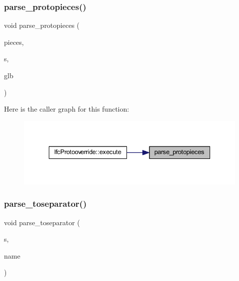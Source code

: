 \mbox{\label{grammar_8hh_a0b78f8e3b11c096eee3367e9f7a783c1}} 
\subsubsection{\texorpdfstring{parse\_protopieces()}{parse\_protopieces()}}
{\footnotesize\ttfamily void parse\+\_\+protopieces (\begin{DoxyParamCaption}\item[{\mbox{\hyperlink{struct_prototype_pieces}{Prototype\+Pieces}} \&}]{pieces,  }\item[{istream \&}]{s,  }\item[{\mbox{\hyperlink{class_architecture}{Architecture}} $\ast$}]{glb }\end{DoxyParamCaption})}

Here is the caller graph for this function\+:
\nopagebreak
\begin{figure}[H]
\begin{center}
\leavevmode
\includegraphics[width=335pt]{grammar_8hh_a0b78f8e3b11c096eee3367e9f7a783c1_icgraph}
\end{center}
\end{figure}
\mbox{\label{grammar_8hh_a555c48bf02e16474c1cf15e761ea7562}} 
\subsubsection{\texorpdfstring{parse\_toseparator()}{parse\_toseparator()}}
{\footnotesize\ttfamily void parse\+\_\+toseparator (\begin{DoxyParamCaption}\item[{istream \&}]{s,  }\item[{string \&}]{name }\end{DoxyParamCaption})}

